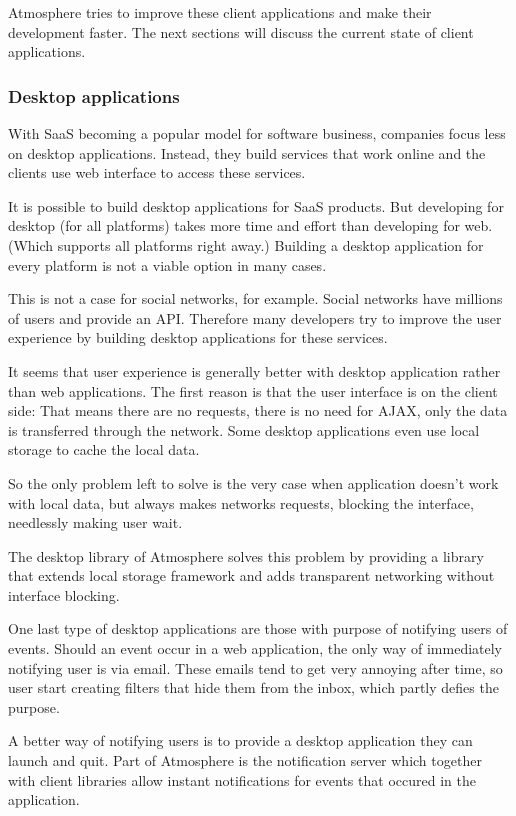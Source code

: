 Atmosphere tries to improve these client applications and make their development faster. The next sections will discuss the current state of client applications.

\subsubsection{Desktop applications}

With SaaS becoming a popular model for software business, companies focus less on desktop applications. Instead, they build services that work online and the clients use web interface to access these services.

It is possible to build desktop applications for SaaS products. But developing for desktop (for all platforms) takes more time and effort than developing for web. (Which supports all platforms right away.) Building a desktop application for every platform is not a viable option in many cases.

This is not a case for social networks, for example. Social networks have millions of users and provide an API. Therefore many developers try to improve the user experience by building desktop applications for these services.

It seems that user experience is generally better with desktop application rather than web applications. The first reason is that the user interface is on the client side: That means there are no requests, there is no need for AJAX, only the data is transferred through the network. Some desktop applications even use local storage to cache the local data.

So the only problem left to solve is the very case when application doesn’t work with local data, but always makes networks requests, blocking the interface, needlessly making user wait. 

The desktop library of Atmosphere solves this problem by providing a library that extends local storage framework and adds transparent networking without interface blocking. 

One last type of desktop applications are those with purpose of notifying users of events. Should an event occur in a web application, the only way of immediately notifying user is via email. These emails tend to get very annoying after time, so user start creating filters that hide them from the inbox, which partly defies the purpose.

A better way of notifying users is to provide a desktop application they can launch and quit. Part of Atmosphere is the notification server which together with client libraries allow instant notifications for events that occured in the application. 

